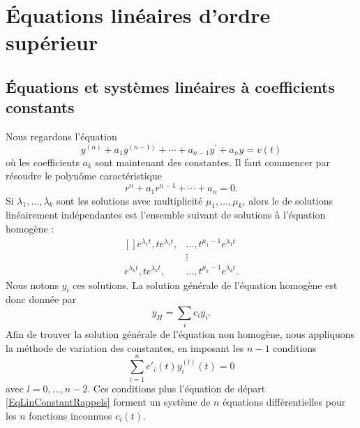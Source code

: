 \section{Équations linéaires d'ordre supérieur}

\subsection{Équations et systèmes linéaires à coefficients constants}
\label{SUBSECooMXLVooALNtge}


Nous regardons l'équation
\begin{equation}	\label{EqLinConstantRappels}
	y^{(n)} + a_1 y^{(n-1)} + \cdots + a_{n-1} y^\prime + a_n y = v(t)
\end{equation}
où les coefficients \( a_k\) sont maintenant des constantes. Il faut commencer par résoudre le polynôme caractéristique
\begin{equation}
	r^n+a_1 r^{n-1}+\cdots +a_n=0.
\end{equation}
Si \( \lambda_1,\ldots,\lambda_k\) sont les solutions avec multiplicité \( \mu_1,\ldots,\mu_k\), alors le  de solutions linéairement indépendantes est l'ensemble suivant de solutions à l'équation homogène :
\begin{equation}
	\begin{aligned}[]
		e^{\lambda_1 t},t e^{\lambda_1 t}, & \ldots,t^{\mu_1-1} e^{\lambda_1  t}  \\
		                                   & \vdots                               \\
		e^{\lambda_k t},t e^{\lambda_k t}, & \ldots,t^{\mu_k-1} e^{\lambda_k  t}.
	\end{aligned}
\end{equation}
Nous notons \( y_i\) ces solutions. La solution générale de l'équation homogène est donc donnée par
\begin{equation}
	y_H=\sum_i c_i y_i.
\end{equation}
Afin de trouver la solution générale de l'équation non homogène, nous appliquons la méthode de variation des constantes, en imposant les \( n-1\) conditions
\begin{equation}		\label{EqVarCstSubtil}
	\sum_{i=1}^n c'_i(t)y_i^{(l)}(t)=0
\end{equation}
avec \( l=0,\ldots,n-2\). Ces conditions plus l'équation de départ \eqref{EqLinConstantRappels} forment un système de \( n\) équations différentielles pour les \( n\) fonctions inconnues \( c_i(t)\).

